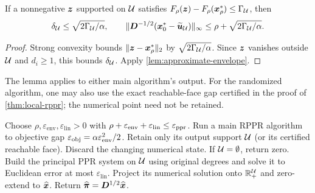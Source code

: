 \begin{lemma}
\label{lem:face-energy-envelope}
If a nonnegative $\bm{z}$ supported on $\mathcal{U}$ satisfies
$F_\rho(\bm{z})-F_\rho(\bm{x}_\rho^*)\leq\Gamma_{\mathcal{U}}$, then
\begin{equation*}
 \delta_{\mathcal{U}}\leq\sqrt{2\Gamma_{\mathcal{U}}/\alpha},\qquad
 \lVert\bm{D}^{-1/2}(\bm{x}_0^*-\widetilde{\bm{u}}_{\mathcal{U}})\rVert_\infty
       \leq\rho+\sqrt{2\Gamma_{\mathcal{U}}/\alpha}.
\end{equation*}
\end{lemma}
\begin{proof}
Strong convexity bounds $\lVert\bm{z}-\bm{x}_\rho^*\rVert_2$ by
$\sqrt{2\Gamma_{\mathcal{U}}/\alpha}$. Since $\bm{z}$ vanishes outside $\mathcal{U}$ and
$d_i\geq1$, this bounds $\delta_{\mathcal{U}}$. Apply
\cref{lem:approximate-envelope}.
\end{proof}

The lemma applies to either main algorithm's output. For the randomized
algorithm, one may also use the exact reachable-face gap certified in the
proof of \cref{thm:local-rppr}; the numerical point need not be retained.

\begin{algorithm}[t]
\caption{PPR with a set-only handoff}
\label{alg:two-stage-ppr}
\begin{algorithmic}[1]
\STATE Choose $\rho,\varepsilon_{\mathrm{env}},\varepsilon_{\mathrm{lin}}>0$ with
       $\rho+\varepsilon_{\mathrm{env}}+\varepsilon_{\mathrm{lin}}\leq\varepsilon_{\mathrm{ppr}}$.
\STATE Run a main RPPR algorithm to objective gap
       $\varepsilon_{\mathrm{obj}}=\alpha\varepsilon_{\mathrm{env}}^2/2$.
\STATE Retain only its output support $\mathcal{U}$ (or its certified reachable face).
       Discard the changing numerical state. If $\mathcal{U}=\emptyset$, return zero.
\STATE Build the principal PPR system on $\mathcal{U}$ using original degrees and
       solve it to Euclidean error at most $\varepsilon_{\mathrm{lin}}$.
\STATE Project its numerical solution onto $\mathbb{R}_+^{\mathcal{U}}$ and zero-extend to
       $\widehat{\bm{x}}$. Return $\widehat{\bm{\pi}}=\bm{D}^{1/2}\widehat{\bm{x}}$.
\end{algorithmic}
\end{algorithm}

